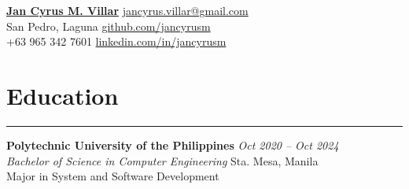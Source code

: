 \documentclass[a4paper, 10pt]{article}
\begin{document}

\href{https://jancyrusm.github.io}{\textbf{\Large Jan Cyrus M. Villar}} \hfill \href{mailto:jancyrus.villar@gmail.com}{jancyrus.villar@gmail.com} \\
San Pedro, Laguna \hfill \href{https://github.com/jancyrusm}{github.com/jancyrusm} \\
+63 965 342 7601 \hfill \href{https://linkedin.com/in/jancyrusm}{linkedin.com/in/jancyrusm}

\vspace{-1em}

\section*{Education}
\vspace{-1.5em}
\noindent\rule{\textwidth}{0.4pt}
\noindent \textbf{Polytechnic University of the Philippines} \hfill \textit{Oct 2020 – Oct 2024} \\
\textit{Bachelor of Science in Computer Engineering} \hfill Sta. Mesa, Manila \\
Major in System and Software Development

\vspace{-1em}
\end{document}
